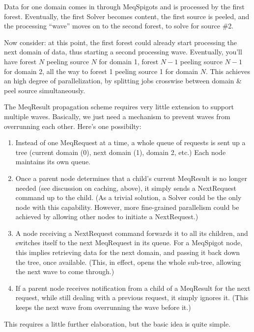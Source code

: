\documentclass[12pt]{article}
\begin{document}
  Data for one domain comes in through MeqSpigots and is processed by the first
  forest. Eventually, the first Solver becomes content, the first source is
  peeled, and the processing ``wave'' moves on to the second forest, to solve
  for source \#2.
  
  Now consider: at this point, the first forest could already start processing
  the next domain of data, thus starting a second processing wave. Eventually,
  you'll have forest $N$ peeling source $N$ for domain 1, forest $N-1$ peeling
  source $N-1$ for domain 2, all the way to forest 1 peeling source 1 for
  domain $N$. This achieves an high degree of parallelization, by splitting
  jobs crosswise between domain \& peel source simultaneously.

  The MeqResult propagation scheme requires very little extension to support
  multiple waves. Basically, we just need a mechanism to prevent waves from
  overrunning each other. Here's one possibilty:

  \begin{enumerate}
  
  \item Instead of one MeqRequest at a time, a whole queue of requests is sent
  up a tree (current domain (0), next domain (1), domain 2, etc.) Each node
  maintains its own queue.

  \item Once a parent node determines that a child's current MeqResult is no
  longer needed (see discussion on caching, above), it simply sends a
  NextRequest command up to the child. (As a trivial solution, a Solver could
  be the only node with this capability. However, more fine-grained parallelism
  could be achieved by allowing other nodes to initiate a NextRequest.)

  \item A node receiving a NextRequest command forwards it to all its children,
  and switches itself to the next MeqRequest in its queue. For a MeqSpigot
  node, this implies retrieving data for the next domain, and passing it back
  down the tree, once available. (This, in effect, opens the whole sub-tree,
  allowing the next wave to come through.)

  \item If a parent node receives notification from a child of a MeqResult for
  the next request, while still dealing with a previous request, it simply
  ignores it. (This keeps the next wave from overrunning the wave before it.)

  \end{enumerate}
  
  This requires a little further elaboration, but the basic idea is quite
  simple.
    
\end{document}
